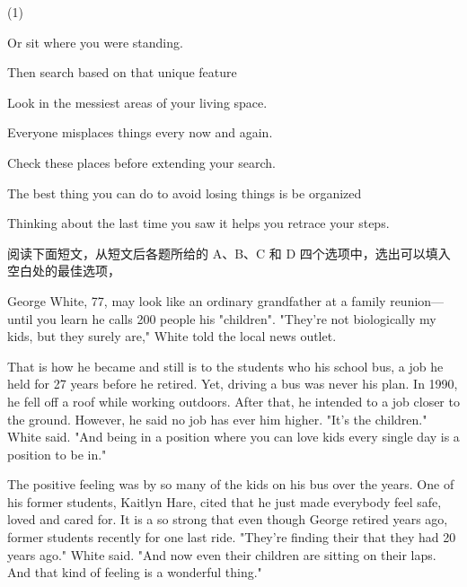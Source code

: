 \documentclass{英语试卷}
\begin{document}
\begin{choices}(1)
  \item Or sit where you were standing.
  \item Then search based on that unique feature
  \item Look in the messiest areas of your living space.
  \item Everyone misplaces things every now and again.
  \item Check these places before extending your search.
  \item The best thing you can do to avoid losing things is be organized
  \item Thinking about the last time you saw it helps you retrace your steps.
\end{choices}
\par 阅读下面短文，从短文后各题所给的 A、B、C 和 D 四个选项中，选出可以填入空白处的最佳选项，\par
\par George White, 77, may look like an ordinary grandfather at a family reunion—until you learn he calls 200 people his "children". "They're not biologically my kids, but  they surely are," White told the local news outlet.\par
\par That is how  he became and still is to the students who  his school bus, a job he held for 27 years before he retired. Yet, driving a bus was never his  plan. In 1990, he fell off a roof while working outdoors. After that, he intended to  a job closer to the ground. However, he said no job has ever  him higher. "It's the children." White said. "And being in a position where you can love kids every single day is a  position to be in."\par
\par The positive feeling was  by so many of the kids on his bus over the years. One of his former students, Kaitlyn Hare, cited that he just made everybody feel safe, loved and cared for. It is a  so strong that even though George retired years ago, former students  recently for one last ride. "They're finding their  that they had 20 years ago." White said. "And now even their children are sitting on their laps. And that kind of feeling is a wonderful thing."\par
\end{document}
